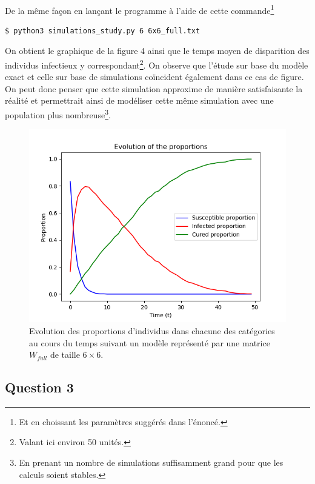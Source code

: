 \documentclass[a4paper, 12pt, oneside]{article}
\begin{document}
\paragraph{}De la même façon en lançant le programme à l'aide de cette commande\footnote{Et en choissant les paramètres suggérés dans l'énoncé.}
\begin{lstlisting}[language=bash]
$ python3 simulations_study.py 6 6x6_full.txt 
\end{lstlisting}

\noindent On obtient le graphique de la figure 4 ainsi que le temps moyen de disparition des individus infectieux y correspondant\footnote{Valant ici environ 50 unités.}. On observe que l'étude sur base du modèle exact et celle sur base de simulations coïncident également dans ce cas de figure. On peut donc penser que cette simulation approxime de manière satisfaisante la réalité et permettrait ainsi de modéliser cette même simulation avec une population plus nombreuse\footnote{En prenant un nombre de simulations suffisamment grand pour que les calculs soient stables.}.

\begin{figure}[H]
	\centering
	\includegraphics[scale=1]{full_6x6_simulations.png} 
	\caption{Evolution des proportions d'individus dans chacune des catégories au cours du temps suivant un modèle représenté par une matrice $W_{full}$ de taille $6 \times 6$.}
\end{figure}

\subsection{Question 3}
\end{document}
